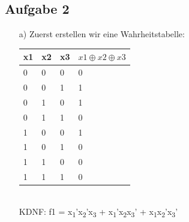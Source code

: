 \documentclass{scrartcl}
\begin{document}
	\subsection*{Aufgabe 2}
	\begin{itemize}
	\item[a)] Zuerst erstellen wir eine Wahrheitstabelle:\\
	\begin{table}[h]
		\begin{tabular}{l|l|l|l}
			x1 & x2 & x3 & $x1\oplus x2\oplus x3$ \\ \hline
			0  & 0  & 0  & 0 \\
			0  & 0  & 1  & 1 \\
			0  & 1  & 0  & 1 \\
			0  & 1  & 1  & 0 \\
			1  & 0  & 0  & 1 \\
			1  & 0  & 1  & 0 \\
			1  & 1  & 0  & 0 \\
			1  & 1  & 1  & 0 \hfill
		\end{tabular}
	\end{table}\\
	KDNF: f1 = x\textsubscript{1}'x\textsubscript{2}'x\textsubscript{3} + x\textsubscript{1}'x\textsubscript{2}x\textsubscript{3}' + x\textsubscript{1}x\textsubscript{2}'x\textsubscript{3}'


\end{itemize}
\end{document}

